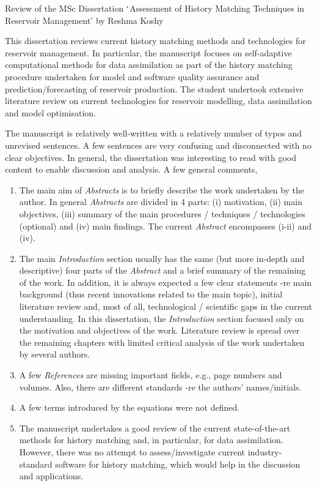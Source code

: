 \documentclass[14pt,twoside]{report}
\begin{document}
\clearpage



\bigskip

\begin{center}
{\Large Review of the MSc Dissertation $\lq$Assessment of History Matching Techniques in Reservoir Management' by Reshma Koshy}
\end{center}

\medskip

This dissertation reviews current history matching methods and technologies for reservoir management. In particular, the manuscript focuses on self-adaptive computational methods for data assimilation as part of the history matching procedure undertaken for model and software quality assurance and prediction/forecasting of reservoir production. The student undertook extensive literature review on current technologies for reservoir modelling, data assimilation and model optimisation. 

The manuscript is relatively well-written with a relatively number of typos and unrevised sentences. A few sentences are very confusing and disconnected with no clear objectives. In general, the dissertation was interesting to read with good content to enable discussion and analysis. A few general comments,
\begin{enumerate}
\item The main aim of {\it Abstracts} is to briefly describe the work undertaken by the author. In general {\it Abstracts} are divided in 4 parts: (i) motivation, (ii) main objectives, (iii) summary of the main procedures / techniques / technologies (optional) and (iv) main findings. The current {\it Abstract} encompasses (i-ii) and (iv).
%
\item The main {\it Introduction} section usually has the same (but more in-depth and descriptive) four parts of the {\it Abstract} and a brief summary of the remaining of the work. In addition, it is always expected a few clear statements -re main background (thus recent innovations related to the main topic), initial literature review and, most of all, technological / scientific gaps in the current understanding. In this dissertation, the {\it Introduction} section focused only on the motivation and objectives of the work. Literature review is spread over the remaining chapters with limited critical analysis of the work undertaken by several authors. 
%
\item A few {\it References} are missing important fields, e.g., page numbers and volumes. Also, there are different standards -re the authors' names/initials.
%
\item A few terms introduced by the equations were not defined. 
%
\item The manuscript undertakes a good review of the current state-of-the-art methods for history matching and, in particular, for data assimilation. However, there was no attempt to assess/investigate current industry-standard software for history matching, which would help in the discussion and applications.  
% 
\end{enumerate}
\end{document}
